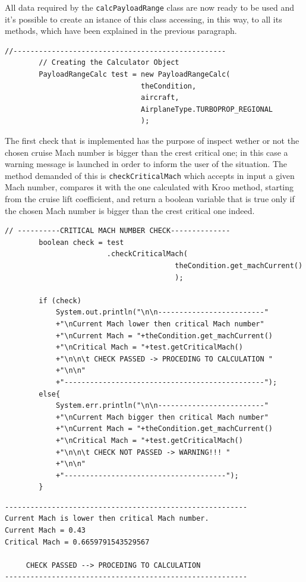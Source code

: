 \documentclass[a4paper,12pt,oneside]{book}
\begin{document}
\bigskip
All data required by the \lstinline[language=Java]!calcPayloadRange! class are now ready to be used and it’s possible to create an istance of this class accessing, in this way, to all its methods, which have been explained in the previous paragraph. 

\bigskip
\begin{lstlisting}[caption={Excerpt of the ATR-72 Payload-Range test - Payload-Range class istance creation}, captionpos=b, tabsize=2]
		//--------------------------------------------------
		// Creating the Calculator Object
		PayloadRangeCalc test = new PayloadRangeCalc(
								theCondition, 
								aircraft,
								AirplaneType.TURBOPROP_REGIONAL
								);
\end{lstlisting}

\bigskip
The first check that is implemented has the purpose of inspect wether or not the chosen cruise Mach number is bigger than the crest critical one; in this case a warning message is launched in order to inform the user of the situation. The method demanded of this is \lstinline[language=Java]!checkCriticalMach! which accepts in input a given Mach number, compares it with the one calculated with Kroo method, starting from the cruise lift coefficient, and return a boolean variable that is true only if the chosen Mach number is bigger than the crest critical one indeed. 

\bigskip
\begin{lstlisting}[caption={Excerpt of the ATR-72 Payload-Range test - critical Mach number check}, captionpos=b, tabsize=2]
		// ----------CRITICAL MACH NUMBER CHECK--------------
		boolean check = test
						.checkCriticalMach(
										theCondition.get_machCurrent()
										);
		
		if (check)
			System.out.println("\n\n-------------------------"
			+"\nCurrent Mach lower then critical Mach number"
			+"\nCurrent Mach = "+theCondition.get_machCurrent() 
			+"\nCritical Mach = "+test.getCriticalMach() 
			+"\n\n\t CHECK PASSED -> PROCEDING TO CALCULATION "
			+"\n\n"
			+"-----------------------------------------------");
		else{
			System.err.println("\n\n-------------------------"
			+"\nCurrent Mach bigger then critical Mach number"
			+"\nCurrent Mach = "+theCondition.get_machCurrent() 
			+"\nCritical Mach = "+test.getCriticalMach() 
			+"\n\n\t CHECK NOT PASSED -> WARNING!!! "
			+"\n\n"
			+"--------------------------------------");
		}
\end{lstlisting}

\bigskip
\begin{lstlisting}[caption={Excerpt of the ATR-72 Payload-Range test results - critical Mach number check}, captionpos=b, tabsize=2]
---------------------------------------------------------
Current Mach is lower then critical Mach number.
Current Mach = 0.43
Critical Mach = 0.6659791543529567

	 CHECK PASSED --> PROCEDING TO CALCULATION 
---------------------------------------------------------
\end{lstlisting}
\end{document}

